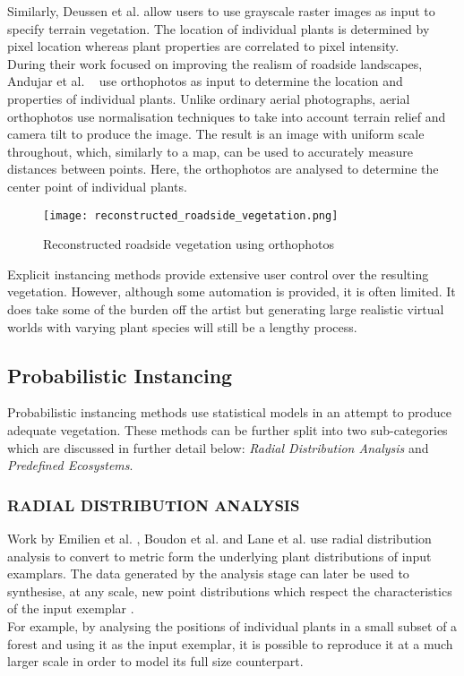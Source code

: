 Similarly, Deussen et al. \cite{Deussen1998} allow users to use grayscale raster images as input to specify terrain vegetation. The location of individual plants is determined by pixel location whereas plant properties are correlated to pixel intensity.\\

During their work focused on improving the realism of roadside landscapes, Andujar et al. ~\cite{Andujar2014} use orthophotos as input to determine the location and properties of individual plants. Unlike ordinary aerial photographs, aerial orthophotos use normalisation techniques to take into account terrain relief and camera tilt to produce the image. The result is an image with uniform scale throughout, which, similarly to a map, can be used to accurately measure distances between points. Here, the orthophotos are analysed to determine the center point of individual plants.\\

\begin{figure}[!htb]
  \centering
	\label{Reconstructed roadside vegetation using orthophotos}
	\texttt{[image: reconstructed\_roadside\_vegetation.png]}
	\caption{Reconstructed roadside vegetation using orthophotos ~\cite{Andujar2014}}
\end{figure}

Explicit instancing methods provide extensive user control over the resulting vegetation. However, although some automation is provided, it is often limited. It does take some of the burden off the artist but generating large realistic virtual worlds with varying plant species will still be a lengthy process. \\

\subsection{Probabilistic Instancing} \label{Probabilistic Instancing}

Probabilistic instancing methods use statistical models in an attempt to produce adequate vegetation. These methods can be further split into two sub-categories which are discussed in further detail below: \textit{Radial Distribution Analysis} and \textit{Predefined Ecosystems}.\\

\subsubsection{RADIAL DISTRIBUTION ANALYSIS}
Work by Emilien et al. \cite{Emilien}, Boudon et al. \cite{Boudon2007} and Lane et al. \cite{Lane2002} use radial distribution analysis to convert to metric form the underlying plant distributions of input examplars. The data generated by the analysis stage can later be used to synthesise, at any scale, new point distributions which respect the characteristics of the input exemplar \cite{Oztireli2012}. \\
For example, by analysing the positions of individual plants in a small subset of a forest and using it as the input exemplar, it is possible to reproduce it at a much larger scale in order to model its full size counterpart.\\

